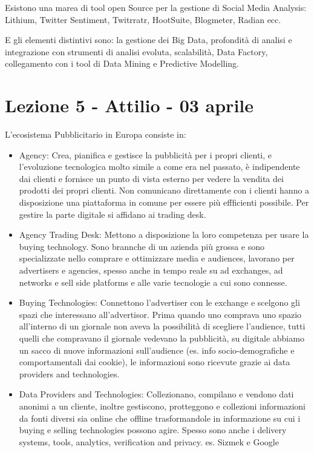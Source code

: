 \documentclass[11pt]{article}
\begin{document}
Esistono una marea di tool open Source per la gestione di Social Media Analysis: Lithium, Twitter Sentiment, Twitrratr, HootSuite, Blogmeter, Radian ecc.

E gli elementi distintivi sono: la gestione dei Big Data, profondità di analisi e integrazione con strumenti di analisi evoluta, scalabilità, Data Factory, collegamento con i tool di Data Mining e Predictive Modelling.

\section{Lezione 5 - Attilio - 03 aprile}

L'ecosistema Pubblicitario in Europa consiste in:
\begin{itemize}
	\item Agency: Crea, pianifica e gestisce la pubblicità per i propri clienti, e l'evoluzione tecnologica molto simile a come era nel passato, è indipendente dai clienti e fornisce un punto di vista esterno per vedere la vendita dei prodotti dei propri clienti. Non comunicano direttamente con i clienti hanno a disposizione una piattaforma in comune per essere più effficienti possibile. Per gestire la parte digitale si affidano ai trading desk.
	\item Agency Trading Desk: Mettono a disposizione la loro competenza per usare la buying technology. Sono brannche di un azienda più grossa e sono specializzate nello comprare e ottimizzare media e audiences, lavorano per advertisers e agencies, spesso anche in tempo reale su ad exchanges, ad networks e sell side platforms e alle varie tecnologie a cui sono connesse.
	\item Buying Technologies: Connettono l'advertiser con le exchange e scelgono gli spazi che interessano all'advertisor. Prima quando uno comprava uno spazio all'interno di un giornale non aveva la possibilità di scegliere l'audience, tutti quelli che compravano il giornale vedevano la pubblicità, su digitale abbiamo un sacco di nuove informazioni sull'audience (es. info socio-demografiche e comportamentali dai cookie), le informazioni sono ricevute grazie ai data providers and technologies.
	\item Data Providers and Technologies: Collezionano, compilano e vendono dati anonimi a un cliente, inoltre gestiscono, protteggono e collezioni informazioni da fonti diversi sia online che offline trasformandole in informazione su cui i buying e selling technologies possono agire. Spesso sono anche i delivery systems, tools, analytics, verification and privacy. es. Sizmek e Google

\end{itemize}
\end{document}
